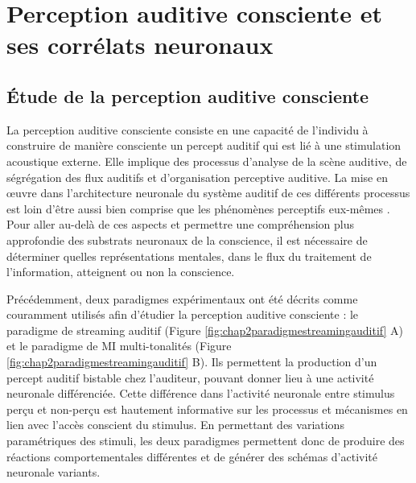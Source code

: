 \section{Perception auditive consciente et ses corrélats neuronaux}
\label{perceptionauditiveconscienteetcorrelats}

\subsection{Étude de la perception auditive consciente}
\label{perceptionauditiveconsciente}

La perception auditive consciente consiste en une capacité de l'individu à construire de manière consciente un percept auditif qui est lié à une stimulation acoustique externe. 
Elle implique des processus d'analyse de la scène auditive, de ségrégation des flux auditifs et d'organisation perceptive auditive. 
La mise en œuvre dans l'architecture neuronale du système auditif de ces différents processus est loin d'être aussi bien comprise que les phénomènes perceptifs eux-mêmes \citep{albouy2013behavioral, bee2008cocktail, bidet2009neurophysiological, micheyl2007role, shamma2010behind, shamma2011temporal, snyder2007toward}.
Pour aller au-delà de ces aspects et permettre une compréhension plus approfondie des substrats neuronaux de la conscience, il est nécessaire de déterminer quelles représentations mentales, dans le flux du traitement de l'information, atteignent ou non la conscience. 

Précédemment, deux paradigmes expérimentaux ont été décrits comme couramment utilisés afin d'étudier la perception auditive consciente : le paradigme de streaming auditif (Figure \ref{fig:chap2paradigmestreamingauditif} A) et le paradigme de MI multi-tonalités (Figure \ref{fig:chap2paradigmestreamingauditif} B). 
Ils permettent la production d'un percept auditif bistable chez l'auditeur, pouvant donner lieu à une activité neuronale différenciée. 
Cette différence dans l'activité neuronale entre stimulus perçu et non-perçu est hautement informative sur les processus et mécanismes en lien avec l'accès conscient du stimulus. 
En permettant des variations paramétriques des stimuli, les deux paradigmes permettent donc de produire des réactions comportementales différentes et de générer des schémas d'activité neuronale variants. 

